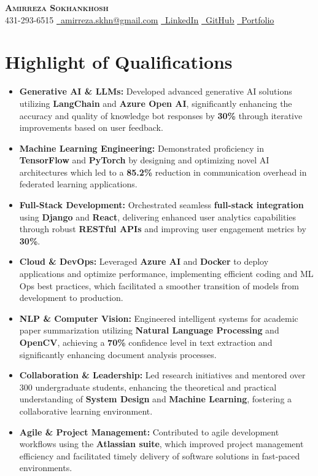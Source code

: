 \documentclass[letterpaper,11pt]{article}
\newcommand{\resumeItem}[1]{
  \item\small{
    #1 \vspace{0pt}
  }
}
\newcommand{\resumeItemListStart}{\begin{itemize}}
\newcommand{\resumeItemListEnd}{\end{itemize}\vspace{-5pt}}
\begin{document}


\begin{center}
    \textbf{\Huge \scshape Amirreza Sokhankhosh} \\ \vspace{1pt}
    \faPhone \small 431-293-6515 \quad
    \href{mailto:amirreza.skhn@gmail.com}{\faEnvelope \ \underline{amirreza.skhn@gmail.com}} \quad
    \href{https://www.linkedin.com/in/amirrezakh/}{\faLinkedin \ \underline{LinkedIn}} \quad
    \href{https://github.com/amirrezaskh}{\faGithub \ \underline{GitHub}} \quad
    \href{https://amirrezaskh.com}{\faBriefcase \ \underline{Portfolio}}
\end{center}

\section{Highlight of Qualifications}
\resumeItemListStart
\resumeItem{\textbf{Generative AI \& LLMs:} Developed advanced generative AI solutions utilizing \textbf{LangChain} and \textbf{Azure Open AI}, significantly enhancing the accuracy and quality of knowledge bot responses by \textbf{30\%} through iterative improvements based on user feedback.}
\resumeItem{\textbf{Machine Learning Engineering:} Demonstrated proficiency in \textbf{TensorFlow} and \textbf{PyTorch} by designing and optimizing novel AI architectures which led to a \textbf{85.2\%} reduction in communication overhead in federated learning applications.}
\resumeItem{\textbf{Full-Stack Development:} Orchestrated seamless \textbf{full-stack integration} using \textbf{Django} and \textbf{React}, delivering enhanced user analytics capabilities through robust \textbf{RESTful APIs} and improving user engagement metrics by \textbf{30\%}.}
\resumeItem{\textbf{Cloud \& DevOps:} Leveraged \textbf{Azure AI} and \textbf{Docker} to deploy applications and optimize performance, implementing efficient coding and ML Ops best practices, which facilitated a smoother transition of models from development to production.}
\resumeItem{\textbf{NLP \& Computer Vision:} Engineered intelligent systems for academic paper summarization utilizing \textbf{Natural Language Processing} and \textbf{OpenCV}, achieving a \textbf{70\%} confidence level in text extraction and significantly enhancing document analysis processes.}
\resumeItem{\textbf{Collaboration \& Leadership:} Led research initiatives and mentored over 300 undergraduate students, enhancing the theoretical and practical understanding of \textbf{System Design} and \textbf{Machine Learning}, fostering a collaborative learning environment.}
\resumeItem{\textbf{Agile \& Project Management:} Contributed to agile development workflows using the \textbf{Atlassian suite}, which improved project management efficiency and facilitated timely delivery of software solutions in fast-paced environments.}
\resumeItemListEnd
\end{document}
